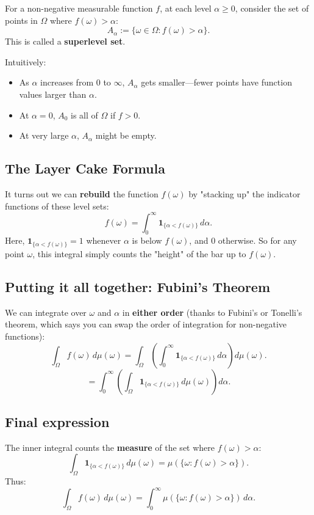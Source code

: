 \documentclass[11pt]{amsart}
\begin{document}
For a non-negative measurable function $f$, at each level $\alpha \geq 0$, consider the set of points in $\Omega$ where $f(\omega) > \alpha$:
\[
	A_\alpha := \{\omega \in \Omega : f(\omega) > \alpha\}.
\]
This is called a \textbf{superlevel set}.

Intuitively:
\begin{itemize}
	\item As $\alpha$ increases from 0 to $\infty$, $A_\alpha$ gets smaller—fewer points have function values larger than $\alpha$.
	\item At $\alpha = 0$, $A_0$ is all of $\Omega$ if $f > 0$.
	\item At very large $\alpha$, $A_\alpha$ might be empty.
\end{itemize}

\subsection*{The Layer Cake Formula}

It turns out we can \textbf{rebuild} the function $f(\omega)$ by "stacking up" the indicator functions of these level sets:
\[
	f(\omega) = \int_0^\infty \mathbf{1}_{\{\alpha < f(\omega)\}} \, d\alpha.
\]
Here, $\mathbf{1}_{\{\alpha < f(\omega)\}} = 1$ whenever $\alpha$ is below $f(\omega)$, and 0 otherwise. So for any point $\omega$, this integral simply counts the "height" of the bar up to $f(\omega)$.

\subsection*{Putting it all together: Fubini's Theorem}

We can integrate over $\omega$ and $\alpha$ in \textbf{either order} (thanks to Fubini's or Tonelli's theorem, which says you can swap the order of integration for non-negative functions):
\[
	\int_\Omega f(\omega) \, d\mu(\omega) = \int_\Omega \left( \int_0^\infty \mathbf{1}_{\{\alpha < f(\omega)\}} \, d\alpha \right) d\mu(\omega).
\]
\[
	= \int_0^\infty \left( \int_\Omega \mathbf{1}_{\{\alpha < f(\omega)\}} \, d\mu(\omega) \right) d\alpha.
\]

\subsection*{Final expression}

The inner integral counts the \textbf{measure} of the set where $f(\omega) > \alpha$:
\[
	\int_\Omega \mathbf{1}_{\{\alpha < f(\omega)\}} \, d\mu(\omega) = \mu(\{\omega : f(\omega) > \alpha\}).
\]
Thus:
\[
	\int_\Omega f(\omega) \, d\mu(\omega) = \int_0^\infty \mu(\{\omega : f(\omega) > \alpha\}) \, d\alpha.
\]
\end{document}
